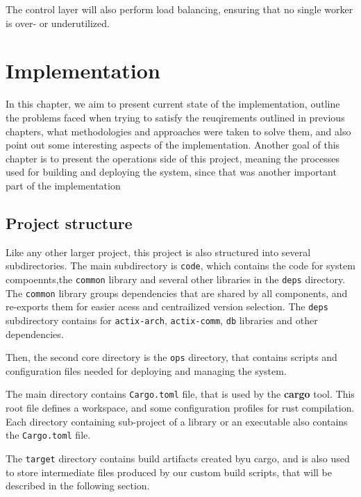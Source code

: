 The control layer will also perform load balancing, ensuring that no single worker is over- or underutilized.




\chapter{Implementation}

In this chapter, we aim to present current state of the implementation, outline the problems faced when trying to satisfy the
reuqirements outlined in previous chapters, what methodologies and approaches were taken to solve them, and also
point out some interesting aspects of the implementation. Another goal of this chapter is to present the operations
side of this project, meaning the processes used for building and deploying the system, since that was another
important part of the implementation

\section{Project structure}
Like any other larger project, this project is also structured into several subdirectories. The main subdirectory is \verb|code|,
which contains the code for system compoennts,the \verb|common| library and several other
libraries in the \verb|deps| directory. The \verb|common| library groups dependencies that
are shared by all components, and re-exports them for easier acess and centrailized version selection. The \verb|deps| subdirectory contains
for \verb|actix-arch|, \verb|actix-comm|, \verb|db| libraries and other dependencies.

Then, the second core directory is the \verb|ops| directory, that contains scripts and configuration files
needed for deploying and managing the system.

The main directory contains \verb|Cargo.toml| file, that is used by the \textbf{cargo} tool. This root file
defines a workspace, and some configuration profiles for rust compilation. Each directory containing sub-project of
a library or an executable also contains the \verb|Cargo.toml| file.

The \verb|target| directory contains build artifacts created byu cargo, and is also used to store intermediate files produced by our custom build scripts, that
will be described in the following section.

